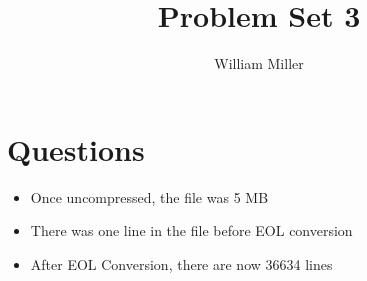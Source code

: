 \documentclass{article}
\title{Problem Set 3}
\author{William Miller}
\begin{document}
\maketitle


\section{Questions}

\begin{itemize}
    \item Once uncompressed, the file was 5 MB
    \item There was one line in the file before EOL conversion
    \item After EOL Conversion, there are now 36634 lines
\end{itemize}
\end{document}
